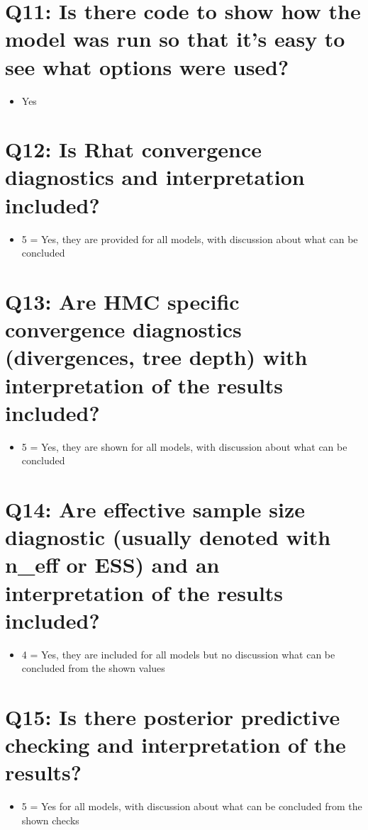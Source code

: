 \documentclass[11pt,a4paper]{article}
\begin{document}
\section{Q11: Is there code to show how the model was run so that it's easy to see what options were used?}
\begin{itemize}
    \item Yes
\end{itemize}

\section{Q12: Is Rhat convergence diagnostics and interpretation included?}
\begin{itemize}
    \item 5 = Yes, they are provided for all models, with discussion about what can be concluded
\end{itemize}

\section{Q13: Are HMC specific convergence diagnostics (divergences, tree depth) with interpretation of the results included?}
\begin{itemize}
    \item 5 = Yes, they are shown for all models, with discussion about what can be concluded
\end{itemize}

\section{Q14: Are effective sample size diagnostic (usually denoted with n\_eff or ESS) and an interpretation of the results included?}
\begin{itemize}
    \item 4 = Yes, they are included for all models but no discussion what can be concluded from the shown values
\end{itemize}

\section{Q15: Is there posterior predictive checking and interpretation of the results?}
\begin{itemize}
    \item 5 = Yes for all models, with discussion about what can be concluded from the shown checks
\end{itemize}
\end{document}
